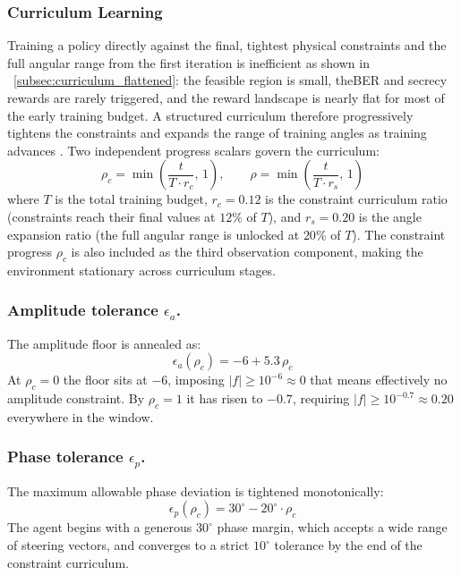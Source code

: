 \subsubsection{Curriculum Learning}
\label{subsubsec:curriculum_learning}
Training a policy directly against the final, tightest physical constraints and the full angular range from the first iteration is inefficient as shown in \subsectionname~\ref{subsec:curriculum_flattened}: the feasible region is small, the\gls{BER} and secrecy rewards are rarely triggered, and the reward landscape is nearly flat for most of the early training budget. A structured curriculum therefore progressively tightens the constraints and expands the range of training angles as training advances \cite{bengio2009curriculum}. Two independent progress scalars govern the curriculum:
\begin{equation}
    \rho_c = \min\!\left(\frac{t}{T \cdot r_c},\, 1\right), \qquad
    \rho = \min\!\left(\frac{t}{T \cdot r_s},\, 1\right)
\end{equation}
where $T$ is the total training budget, $r_c = 0.12$ is the constraint curriculum ratio (constraints reach their final values at $12\%$ of $T$), and $r_s = 0.20$ is the angle expansion ratio (the full angular range is unlocked at $20\%$ of $T$). The constraint progress $\rho_c$ is also included as the third observation component, making the environment stationary across curriculum stages.

\subsubsection{Amplitude tolerance $\epsilon_a$.}
The amplitude floor is annealed as:
\begin{equation}
    \epsilon_a(\rho_c) = -6 + 5.3\,\rho_c
\end{equation}
At $\rho_c = 0$ the floor sits at $-6$, imposing $|f| \geq 10^{-6} \approx 0$ that means effectively no amplitude constraint. By $\rho_c = 1$ it has risen to $-0.7$, requiring $|f| \geq 10^{-0.7} \approx 0.20$ everywhere in the window.

\subsubsection{Phase tolerance $\epsilon_p$.}
The maximum allowable phase deviation is tightened monotonically:
\begin{equation}
    \epsilon_p(\rho_c) = 30^\circ - 20^\circ \cdot \rho_c
\end{equation}
The agent begins with a generous $30^\circ$ phase margin, which accepts a wide range of steering vectors, and converges to a strict $10^\circ$ tolerance by the end of the constraint curriculum.

